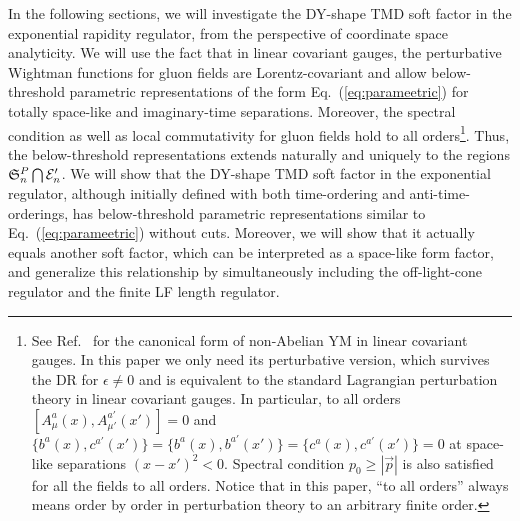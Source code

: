 \documentclass[a4paper,11pt]{article}
\begin{document}
In the following sections, we will investigate the DY-shape TMD soft factor in the exponential rapidity regulator, from the perspective of coordinate space analyticity. We will use the fact that in linear covariant gauges, the perturbative Wightman functions for gluon fields are Lorentz-covariant and allow below-threshold parametric representations of the form Eq.~(\ref{eq:parameetric}) for totally space-like and imaginary-time separations. 
Moreover, the spectral condition as well as local commutativity for gluon fields hold to all orders\footnote{See Ref.~\cite{Kugo:1979gm} for the canonical form of non-Abelian YM in linear covariant gauges. In this paper we only need its perturbative version, which survives the DR for $\epsilon \ne 0$ and is equivalent to the standard Lagrangian perturbation theory in linear covariant gauges. In particular, to all orders $[A^{a}_{\mu}(x),A^{a'}_{\mu'}(x')]=0$ and $ \{b^a(x),c^{a'}(x')\}= \{b^a(x),b^{a'}(x')\}=  \{c^a(x),c^{a'}(x')\}=0$ at space-like separations $(x-x')^2<0$. Spectral condition $p_0\ge |\vec{p}|$ is also satisfied for all the fields to all orders.  Notice that in this paper, ``to all orders'' always means order by order in perturbation theory to an arbitrary finite order.}. Thus, the below-threshold representations extends naturally and uniquely to the regions $\mathfrak{S}_n^P \bigcap {\cal E}_n'$. We will show that the DY-shape TMD soft factor in the exponential regulator,  although initially defined with both time-ordering and anti-time-orderings, has below-threshold parametric representations similar to Eq.~(\ref{eq:parameetric}) without cuts. Moreover, we will show that it actually equals another soft factor, which can be interpreted as a space-like form factor, and generalize this relationship by simultaneously including the off-light-cone regulator and the finite LF length regulator. 
\end{document}

